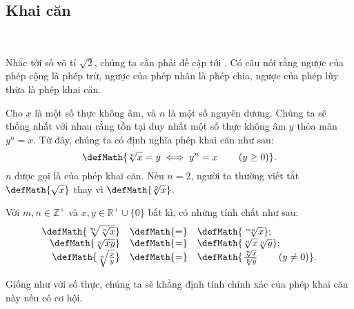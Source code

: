 \subsection{Khai căn}

\ %

Nhắc tới số vô tỉ $\sqrt{2}$, chúng ta cần phải đề cập tới . Có câu nói rằng ngược của phép cộng là phép trừ, ngược của phép nhân là phép chia, ngược của phép lũy thừa là phép khai căn. 

Cho $x$ là một số thực không âm, và $n$ là một số nguyên dương. Chúng ta sẽ thống nhất với nhau rằng tồn tại duy nhất một số thực không âm $y$ thỏa mãn $y^n = x$. Từ đây, chúng ta có định nghĩa phép khai căn như sau:
$$\defMath{ \sqrt[n]{x} = y \iff y^n = x\qquad \left(y \geq 0\right)}.$$
$n$ được gọi là  của phép khai căn. Nếu $n = 2$, người ta thường viết tắt $\defMath{\sqrt{x}}$ thay vì $\defMath{\sqrt[2]{x}}$.

Với $m,n\in \mathbb{Z}^+$ và $x, y \in \mathbb{R}^+ \cup \{0\}$ bất kì, có những tính chất như sau:
$$
\begin{array}{rcl}
   \defMath{\sqrt[m]{\sqrt[n]{x}}} & \defMath{=} & \defMath{\sqrt[mn]{x}}; \\ 
   \defMath{\sqrt[n]{xy}} & \defMath{=} & \defMath{\sqrt[n]{x} \sqrt[n]{y}}; \\ 
   \defMath{\sqrt[n]{\frac{x}{y}}} & \defMath{=} & \defMath{\frac{\sqrt[n]{x}}{\sqrt[n]{y}}\qquad\left(y\neq 0\right)}.
\end{array}
$$



Giống như với số thực, chúng ta sẽ khẳng định tính chính xác của phép khai căn này nếu có cơ hội.